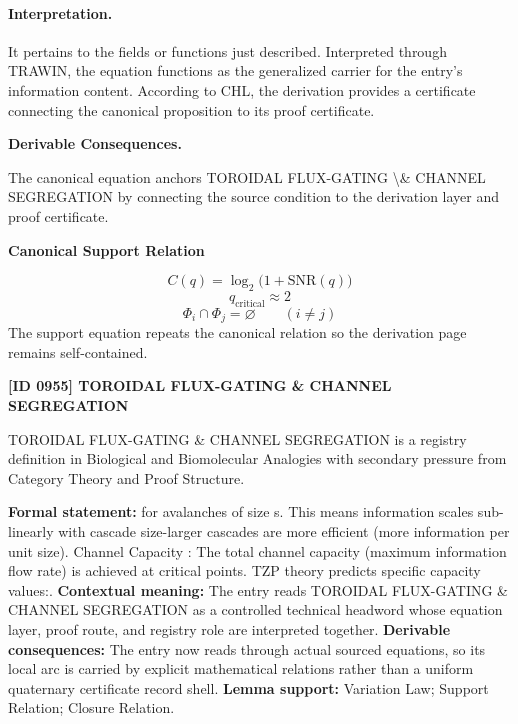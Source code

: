 \paragraph{Interpretation.}
It pertains to the fields or functions just described. Interpreted through TRAWIN, the equation functions as the generalized carrier for the entry’s information content. According to CHL, the derivation provides a certificate connecting the canonical proposition to its proof certificate.

\par\vspace{0.35em}
\noindent\textbf{Derivable Consequences.}\quad
\begingroup
\footnotesize
\raggedright
The canonical equation anchors TOROIDAL FLUX-GATING \textbackslash{}\& CHANNEL SEGREGATION by connecting the source condition to the derivation layer and proof certificate.
\par\endgroup

\noindent\textbf{Canonical Support Relation}\par
\[
C(q)=\log_2\!\bigl(1+\mathrm{SNR}(q)\bigr)
\]
\[
q_{\mathrm{critical}}\approx 2
\]
\[
\Phi_i\cap\Phi_j=\varnothing\qquad(i\neq j)
\]
\noindent The support equation repeats the canonical relation so the derivation page remains self-contained.\par

\clearpage
\noindent\textbf{[ID 0955] TOROIDAL FLUX-GATING \& CHANNEL SEGREGATION}\par
\vspace{0.35em}
\begingroup\small
{}
TOROIDAL FLUX-GATING \& CHANNEL SEGREGATION is a registry definition in Biological and Biomolecular Analogies with secondary pressure from Category Theory and Proof Structure.

\begingroup\footnotesize\setlength{\emergencystretch}{3em}\sloppy
\textbf{Formal statement:} for avalanches of size s. This means information scales sub-linearly with cascade size-larger cascades are more efficient (more information per unit size). Channel Capacity : The total channel capacity (maximum information flow rate) is achieved at critical points. TZP theory predicts specific capacity values:. \textbf{Contextual meaning:} The entry reads TOROIDAL FLUX-GATING \& CHANNEL SEGREGATION as a controlled technical headword whose equation layer, proof route, and registry role are interpreted together. \textbf{Derivable consequences:} The entry now reads through actual sourced equations, so its local arc is carried by explicit mathematical relations rather than a uniform quaternary certificate record shell. \textbf{Lemma support:} Variation Law; Support Relation; Closure Relation.\par
\endgroup

